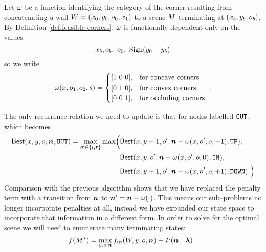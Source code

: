 Let $\CategoryFunc$ be a function identifying the
category of the corner resulting from concatenating a wall
$\Wall=(x_0,y_0,\WallOrient_0,x_1)$ to a scene $\Scene$ terminating at
$(x_b,y_b,\WallOrient_b)$. By Definition \ref{def:feasible-corners},
$\CategoryFunc$ is functionally dependent only on the values
\begin{equation}
  x_b, \WallOrient_b, ~\WallOrient_0, ~\sign(y_0-y_b)
\end{equation}
so we write
\begin{equation}
  \CategoryFunc(x,\WallOrient_1,\WallOrient_2,s) =
  \begin{cases}
    [1 ~ 0 ~ 0], & \mbox{for concave corners}\\
    [0 ~ 1 ~ 0], & \mbox{for convex corners}\\
    [0 ~ 0 ~ 1], & \mbox{for occluding corners}\\
  \end{cases}~.
\end{equation}

The only recurrence relation we need to update is
that for nodes labelled $\OUTlabel$, which becomes
\begin{equation}
  \begin{split}
    \label{eq:fout-recurrence-aug}
    \SubProb(x,y,\WallOrient,\Counts,\OUTlabel) = 
    \max_{\WallOrient'\in\{l,r\}} \max \Bigl(
      &\SubProb(x,y-1,\WallOrient', 
        \Counts-\CategoryFunc(x,\WallOrient',\WallOrient,-1), \UPlabel),\\
      &\SubProb(x,y,\WallOrient',
        \Counts-\CategoryFunc(x,\WallOrient',\WallOrient,0), \INlabel),\\
      &\SubProb(x,y+1,\WallOrient',
        \Counts-\CategoryFunc(x,\WallOrient',\WallOrient,+1), \DOWNlabel)~
    \Bigr)
  \end{split}
\end{equation}
Comparison with the previous algorithm shows that we have replaced
the penalty term with a transition from $\Counts$ to
$\Counts'=\Counts-\CategoryFunc(\cdot)$. This means our sub--problems
no longer incorporate penalties at all, instead we have expanded our
state space to incorporate that information in a different form. In
order to solve for the optimal scene we will need to enumerate many
terminating states:
\begin{equation}
  \label{eq:opt-entry-point2}
  \Objective(\OptimalScene) = 
  \max_{y,\WallOrient,\Counts}
    \SubProbIN(\Width,y,\WallOrient,\Counts) -
    P(\Counts~|~\Penalties)
  ~.
\end{equation}

